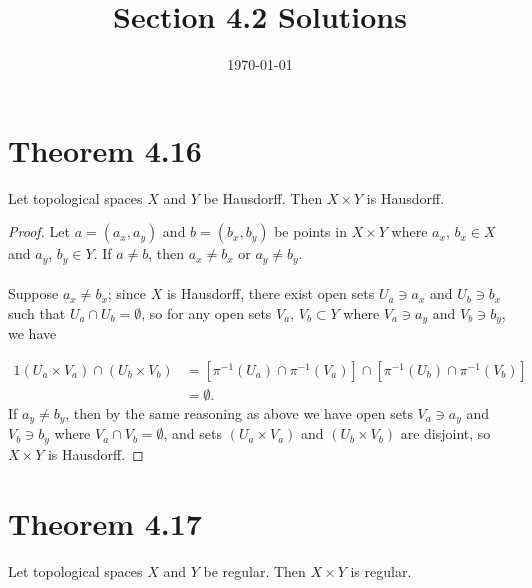 \documentclass{article}
\title{\textbf{Section 4.2 Solutions}}
\date{}
\date\today
\begin{document}
\maketitle %

\thispagestyle{firstpage}
\section*{Theorem 4.16}

Let topological spaces $X$ and $Y$ be Hausdorff.  Then $X \times Y$ is Hausdorff. 

\begin{proof}
  Let $a = (a_x, a_y)$ and $b = (b_x, b_y)$ be points in $X \times Y$ where $a_x$, $b_x \in X$ and $a_y$, $b_y \in Y$.  If 
  $a \neq b$, then $a_x \neq b_x$ or $a_y \neq b_y$.  \\
  \\
  Suppose $a_x \neq b_x$; since $X$ is Hausdorff, there exist open sets $U_a \ni a_x$ and $U_b \ni b_x$ such that $U_a \cap U_b = \emptyset$, 
  so for any open sets $V_a$, $V_b \subset Y$ where $V_a \ni a_y$ and $V_b \ni b_y$, we have 

  \begin{alignat*}{1}
    (U_a \times V_a) \cap (U_b \times V_b) &= \left[ \pi^{-1}(U_a) \cap \pi^{-1}(V_a) \right] \cap \left[ \pi^{-1}(U_b) \cap \pi^{-1}(V_b) \right] \\ 
    &= \emptyset.
  \end{alignat*}
  If $a_y \neq b_y$, then by the same reasoning as above we have open sets $V_a \ni a_y$ and $V_b \ni b_y$ where $V_a \cap V_b = \emptyset$, 
  and sets $(U_a \times V_a)$ and $(U_b \times V_b)$ are disjoint, so $X \times Y$ is Hausdorff.
\end{proof}



\section*{Theorem 4.17} 

Let topological spaces $X$ and $Y$ be regular.  Then $X \times Y$ is regular.
\end{document}
